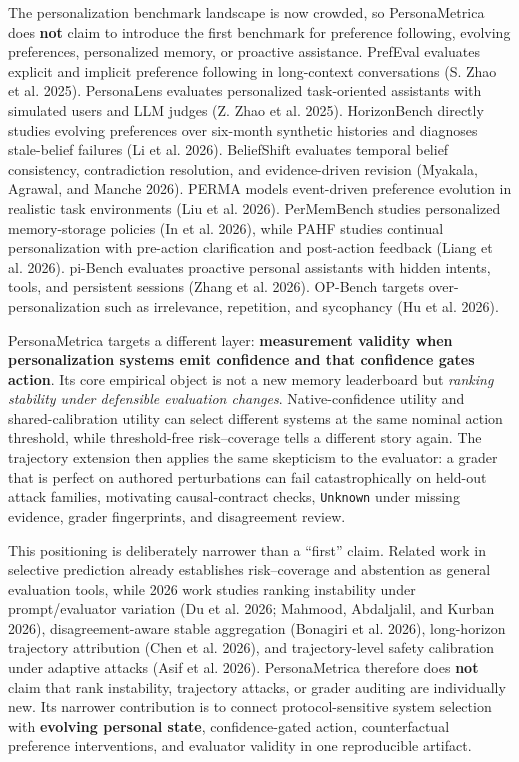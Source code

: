 \documentclass[
  10pt,
  letterpaper,
]{article}
\begin{document}
The personalization benchmark landscape is now crowded, so
PersonaMetrica does \textbf{not} claim to introduce the first benchmark
for preference following, evolving preferences, personalized memory, or
proactive assistance. PrefEval evaluates explicit and implicit
preference following in long-context conversations (S. Zhao et al.
2025). PersonaLens evaluates personalized task-oriented assistants with
simulated users and LLM judges (Z. Zhao et al. 2025). HorizonBench
directly studies evolving preferences over six-month synthetic histories
and diagnoses stale-belief failures (Li et al. 2026). BeliefShift
evaluates temporal belief consistency, contradiction resolution, and
evidence-driven revision (Myakala, Agrawal, and Manche 2026). PERMA
models event-driven preference evolution in realistic task environments
(Liu et al. 2026). PerMemBench studies personalized memory-storage
policies (In et al. 2026), while PAHF studies continual personalization
with pre-action clarification and post-action feedback (Liang et al.
2026). pi-Bench evaluates proactive personal assistants with hidden
intents, tools, and persistent sessions (Zhang et al. 2026). OP-Bench
targets over-personalization such as irrelevance, repetition, and
sycophancy (Hu et al. 2026).

PersonaMetrica targets a different layer: \textbf{measurement validity
when personalization systems emit confidence and that confidence gates
action}. Its core empirical object is not a new memory leaderboard but
\emph{ranking stability under defensible evaluation changes}.
Native-confidence utility and shared-calibration utility can select
different systems at the same nominal action threshold, while
threshold-free risk--coverage tells a different story again. The
trajectory extension then applies the same skepticism to the evaluator:
a grader that is perfect on authored perturbations can fail
catastrophically on held-out attack families, motivating causal-contract
checks, \texttt{Unknown} under missing evidence, grader fingerprints,
and disagreement review.

This positioning is deliberately narrower than a ``first'' claim.
Related work in selective prediction already establishes risk--coverage
and abstention as general evaluation tools, while 2026 work studies
ranking instability under prompt/evaluator variation (Du et al. 2026;
Mahmood, Abdaljalil, and Kurban 2026), disagreement-aware stable
aggregation (Bonagiri et al. 2026), long-horizon trajectory attribution
(Chen et al. 2026), and trajectory-level safety calibration under
adaptive attacks (Asif et al. 2026). PersonaMetrica therefore does
\textbf{not} claim that rank instability, trajectory attacks, or grader
auditing are individually new. Its narrower contribution is to connect
protocol-sensitive system selection with \textbf{evolving personal
state}, confidence-gated action, counterfactual preference
interventions, and evaluator validity in one reproducible artifact.
\end{document}
